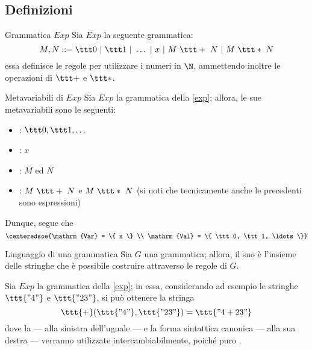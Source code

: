 \documentclass[a4paper, 12pt]{report}
\begin{document}
    \subsection{Definizioni}

    \begin{frameddefn}[label={exp}]{Grammatica $Exp$}
        Sia $Exp$ la seguente grammatica: $$M, N ::= \ttt 0 \ | \ \ttt 1 \ | \ \ldots \ | \ x \ | \ M \ \ttt + \ N \ | \ M \ \ttt * \ N$$ essa definisce le regole per utilizzare i numeri in $\N$, ammettendo inoltre le operazioni  di $\ttt +$ e $\ttt *$.
    \end{frameddefn}

    \begin{framedobs}{Metavariabili di $Exp$}
        Sia $Exp$ la grammatica della \cref{exp}; allora, le sue metavariabili sono le seguenti:

        \begin{itemize}
            \item {}: $\ttt 0, \ttt 1,  \ldots$
            \item {}: $x$
            \item {}: $M$ ed $N$
            \item {}: $M \ \ttt + \ N$ e $M \ \ttt * \ N$ (si noti che tecnicamente anche le precedenti sono espressioni)
        \end{itemize}

        Dunque, segue che $$\centeredsoe{\mathrm{Var} = \{ x \} \\ \mathrm{Val} = \{ \ttt 0, \ttt 1, \ldots \}}$$
    \end{framedobs}

    \begin{frameddefn}{Linguaggio di una grammatica}
        Sia $G$ una grammatica; allora, il suo  è l'insieme delle stringhe che è possibile costruire attraverso le regole di $G$.
    \end{frameddefn}

    \begin{example}
        Sia $Exp$ la grammatica della \cref{exp}; in essa, considerando ad esempio le stringhe $\ttt{"4"}$ e $\ttt{"23"}$, si può ottenere la stringa $$\ttt{+}(\ttt{"4"}, \ttt{"23"}) = \ttt{"4 + 23"}$$ dove la  --- alla sinistra dell'uguale --- e la forma sintattica canonica --- alla sua destra --- verranno utilizzate intercambiabilmente, poiché puro .
    \end{example}
\end{document}
